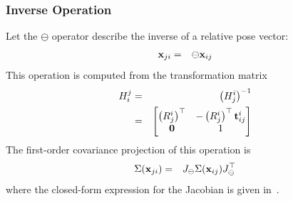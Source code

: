 \documentclass[conference]{IEEEtran}
\begin{document}
\subsubsection{Inverse Operation}
\label{sub:inverseoperation}
Let the $\ominus$ operator describe the inverse of a relative pose
vector:
\begin{eqnarray*}
  {\bf x}_{ji} & = & \ominus {\bf x}_{ij}
\end{eqnarray*}
This operation is computed from the transformation matrix
\begin{eqnarray*}
  H_i^j & = & \left(H_j^i\right)^{-1} \\
  & = & \begin{bmatrix}
    \left( R_j^i \right)^\top & -\left( R_j^i \right)^\top {\bf t}_{ij}^i\\
    {\bf 0} & 1
  \end{bmatrix}
\end{eqnarray*}
The first-order covariance projection of this operation is
\begin{eqnarray*}
  \Sigma({\bf x}_{ji}) & = & J_\ominus \Sigma({\bf x}_{ij}) J_\ominus^\top
\end{eqnarray*}
where the closed-form expression for the Jacobian is given
in~\cite{reustice-phdthesis}.
\end{document}
